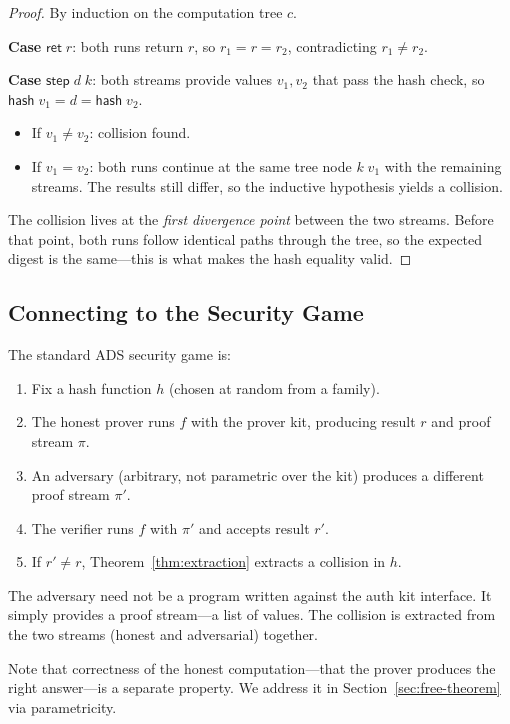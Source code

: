 \documentclass[acmsmall,screen,review,anonymous]{acmart}
\begin{document}
\begin{proof}
By induction on the computation tree $c$.

\textbf{Case} $\mathsf{ret}\;r$: both runs return $r$, so
$r_1 = r = r_2$, contradicting $r_1 \neq r_2$.

\textbf{Case} $\mathsf{step}\;d\;k$: both streams provide values
$v_1, v_2$ that pass the hash check, so
$\mathsf{hash}\;v_1 = d = \mathsf{hash}\;v_2$.
\begin{itemize}
\item If $v_1 \neq v_2$: collision found.
\item If $v_1 = v_2$: both runs continue at the same tree node
  $k\;v_1$ with the remaining streams.  The results still differ,
  so the inductive hypothesis yields a collision.
\end{itemize}
The collision lives at the \emph{first divergence point} between
the two streams.  Before that point, both runs follow identical
paths through the tree, so the expected digest is the same---this
is what makes the hash equality valid.
\end{proof}

\subsection{Connecting to the Security Game}

The standard ADS security game is:
\begin{enumerate}
\item Fix a hash function $h$ (chosen at random from a family).
\item The honest prover runs $f$ with the prover kit, producing
  result $r$ and proof stream $\pi$.
\item An adversary (arbitrary, not parametric over the kit) produces
  a different proof stream $\pi'$.
\item The verifier runs $f$ with $\pi'$ and accepts result $r'$.
\item If $r' \neq r$, Theorem~\ref{thm:extraction} extracts a
  collision in $h$.
\end{enumerate}
The adversary need not be a program written against the auth kit
interface.  It simply provides a proof stream---a list of values.
The collision is extracted from the two streams (honest and
adversarial) together.

Note that correctness of the honest computation---that the prover
produces the right answer---is a separate property.  We address it
in Section~\ref{sec:free-theorem} via parametricity.
\end{document}
